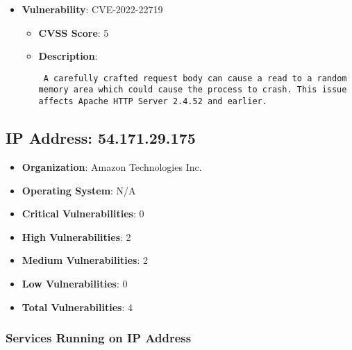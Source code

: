 \documentclass{article}
\begin{document}
\begin{itemize}
        \item \textbf{Vulnerability}: CVE-2022-22719
        \begin{itemize}
            \item \textbf{CVSS Score}:  5 
            \item \textbf{Description}: \parbox{\linewidth}{\texttt{ A carefully crafted request body can cause a read to a random memory area which could cause the process to crash. This issue affects Apache HTTP Server 2.4.52 and earlier. }}
        \end{itemize}
    
\end{itemize}


\clearpage



\subsection*{IP Address: 54.171.29.175}

\begin{itemize}
    \item \textbf{Organization}: Amazon Technologies Inc.
    \item \textbf{Operating System}:  N/A 
    \item \textbf{Critical Vulnerabilities}: 0
    \item \textbf{High Vulnerabilities}: 2
    \item \textbf{Medium Vulnerabilities}: 2
    \item \textbf{Low Vulnerabilities}: 0
    \item \textbf{Total Vulnerabilities}: 4
\end{itemize}

\subsubsection*{Services Running on IP Address}
\end{document}
